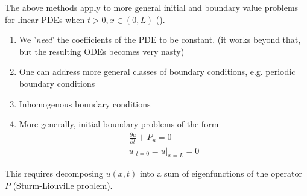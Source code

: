 \begin{framedremark}
	The above methods apply to more general initial and boundary value problems for linear PDEs when $t > 0, x \in \left(0, L\right)$ ().
	\begin{enumerate}
		\item We '\textit{need}' the coefficients of the PDE to be constant. (it works beyond that, but the resulting ODEs becomes very nasty)
		\item One can address more general classes of boundary conditions, e.g. periodic boundary conditions
		\item Inhomogenous boundary conditions
		\item More generally, initial boundary problems of the form 
			\begin{align*} 
				\frac{\partial u}{\partial t} + P_u = 0\\
				u|_{t= 0}= u |_{x= L}= 0
			\end{align*}
	\end{enumerate}
	This requires decomposing $u\left(x, t\right)$ into a sum of eigenfunctions of the operator $P$  (Sturm-Liouville problem).
	
	
\end{framedremark}





